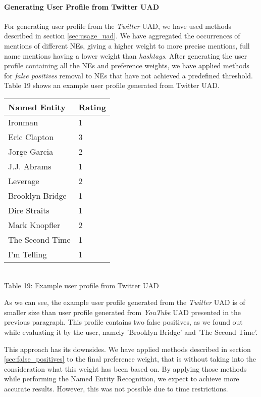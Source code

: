 \paragraph{Generating User Profile from Twitter UAD}

For generating user profile from the \textit{Twitter} UAD, we have used methods
described in section \ref{sec:usage_uad}. We have aggregated the occurrences
of mentions of different NEs, giving a higher weight to more precise mentions, \eg
full name mentions having a lower weight than \textit{hashtags}. After
generating the user profile containing all the NEs and preference weights, we have
applied methods for \textit{false positives} removal to NEs that have not achieved
a predefined threshold. Table 19 shows an example user profile generated from Twitter
UAD.

\begin{center}
  \begin{tabular}{| l | l |}
Named Entity & Rating \\ \hline
Ironman & 1 \\
Eric Clapton & 3 \\
Jorge Garcia & 2 \\
J.J. Abrams & 1 \\
Leverage & 2 \\
Brooklyn Bridge & 1 \\
Dire Straits & 1 \\
Mark Knopfler & 2 \\
The Second Time & 1 \\
I'm Telling & 1 \\
  \end{tabular} \\
  Table 19: Example user profile from Twitter UAD
\end{center}

As we can see, the example user profile generated from the \textit{Twitter} UAD is of smaller size
than user profile generated from \textit{YouTube} UAD presented in the previous paragraph. This profile
contains two false positives, as we found out while evaluating it by the user, namely 'Brooklyn Bridge'
and 'The Second Time'.

This approach has its downsides. We have applied methods described in section \ref{sec:false_positives}
to the final preference weight, that is without taking into the consideration what
this weight has been based on. By applying those methods while performing the Named Entity Recognition,
we expect to achieve more accurate results. However, this was not possible due to time restrictions.

